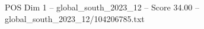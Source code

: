 \begin{textsample}{POS Dim 1 – global\_south\_2023\_12 – Score 34.00 – global\_south\_2023\_12/104206785.txt}
\end{textsample}
